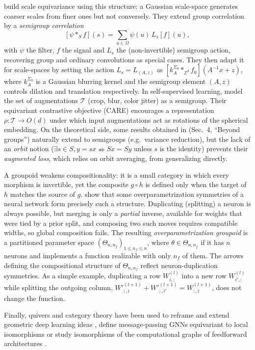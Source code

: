 \documentclass[mathematics,review,submit,moreauthors]{Definitions/mdpi}
\begin{document}
\citet{worrall2019anips} build scale equivariance using this structure: a Gaussian scale-space generates coarser scales from finer ones but not conversely.
They extend group correlation by a \emph{semigroup correlation}
$$[\psi *_{S} f](s)=\sum_{u\in \Omega}\psi(u)\,L_{s}[f](u),$$
with $\psi$ the filter, $f$ the signal and $L_s$ the (non-invertible) semigroup action, recovering group and ordinary convolutions as special cases. 
They then adapt it for scale-spaces by setting the action $L_s=L_{(A,z)}$ as $[k_{A}^{\Sigma_{0}}*_{\mathbb{Z}^{d}}f_0](A^{-1}x+z)$, where $k_{A}^{\Sigma_{0}}$ is a Gaussian blurring kernel and the semigroup element $(A,z)$ controls dilation and translation respectively.
In self-supervised learning, \citet{gupta2023a} model the set of augmentations $\mathcal{T}$ (crop, blur, color jitter) as a semigroup.
Their equivariant contrastive objective (CARE) encourages a representation $\rho:\mathcal{T}\to O(d)$ under which input augmentations act as rotations of the spherical embedding.
On the theoretical side, some results obtained in \citep{chen2020} (Sec.~4, ``Beyond groups'') naturally extend to semigroups (e.g.\ variance reduction), but the lack of an \emph{orbit} notion ($\exists s \in S, y=sx \nRightarrow Sx=Sy$ unless $s$ is the identity) prevents their \textit{augmented loss}, which relies on orbit averaging, from generalizing directly.

A groupoid weakens compositionality: it is a small category in which every morphism is invertible, yet the composite $g\circ h$ is defined only when the target of $h$ matches the source of $g$.
\citet{sareen2026} show that some overparametrization symmetries of a neural network form precisely such a structure.
Duplicating (splitting) a neuron is always possible, but merging is only a \emph{partial} inverse, available for weights that were tied by a prior split, and composing two such moves requires compatible widths, so global composition fails.
The resulting \emph{overparametrization groupoid} is a partitioned parameter space $(\Theta_{n,n_f})_{1\le n_f\le n}$, where $\theta\in\Theta_{n,n_f}$ if it has $n$ neurons and implements a function realizable with only $n_f$ of them.
The arrows defining the compositional structure of $\Theta_{n, n_f}$ reflect neuron-duplication symmetries.
As a simple example, duplicating a row $W^{(l)}_{i,:}$ into a new row $W^{(l)}_{i',:}$ while splitting the outgoing column, $W'^{(l+1)}_{:,i}+W'^{(l+1)}_{:,i'}=W^{(l+1)}_{:,i}$, does not change the function.

Finally, quivers and category theory have been used to reframe and extend geometric deep learning ideas \citep{gavranovic2024}, define message-passing GNNs equivariant to local isomorphisms \citep{dehaan2020} or study isomorphisms of the computational graphs of feedforward architectures \citep{armenta2021a}.
\end{document}
